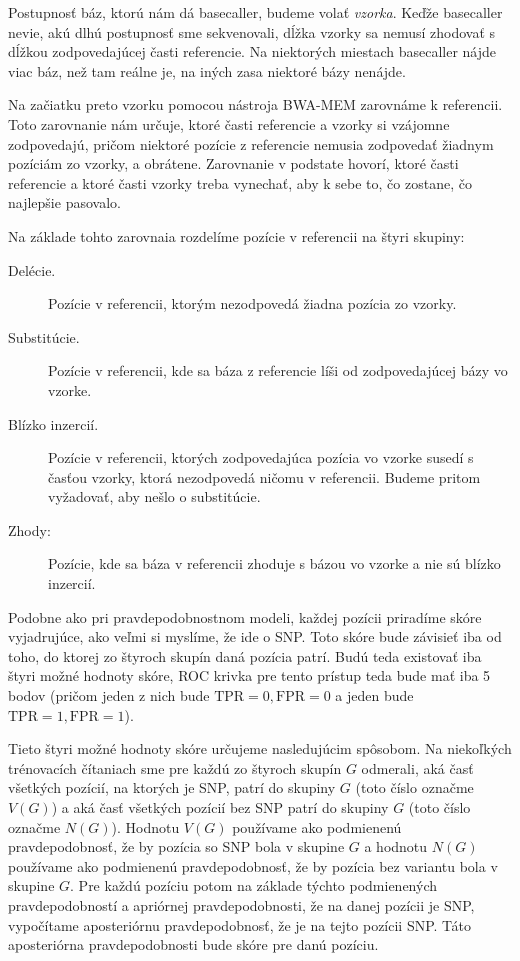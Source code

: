Postupnosť báz, ktorú nám dá basecaller, budeme volať \emph{vzorka}. Keďže basecaller nevie,
akú dlhú postupnosť sme sekvenovali, dĺžka vzorky sa nemusí zhodovať s dĺžkou 
zodpovedajúcej časti referencie.
Na niektorých miestach basecaller nájde viac báz, než tam reálne je, na iných zasa niektoré
bázy nenájde.

Na začiatku preto vzorku pomocou nástroja BWA-MEM zarovnáme k referencii. 
Toto zarovnanie nám určuje, ktoré časti referencie a vzorky si vzájomne zodpovedajú, pričom
niektoré pozície z referencie nemusia zodpovedať žiadnym pozíciám zo vzorky, a obrátene. Zarovnanie v podstate hovorí, ktoré časti referencie 
a ktoré časti vzorky treba vynechať, aby k sebe to, čo zostane, čo najlepšie pasovalo. 


Na základe
tohto zarovnaia rozdelíme pozície v referencii na štyri skupiny:

\begin{description}

\item[Delécie.] Pozície v referencii, ktorým nezodpovedá žiadna pozícia zo vzorky.
\item[Substitúcie.] Pozície v referencii, kde sa báza z referencie líši od zodpovedajúcej
bázy vo vzorke.
\item[Blízko inzercií.] Pozície v referencii, ktorých zodpovedajúca pozícia vo vzorke susedí
s časťou vzorky, ktorá nezodpovedá ničomu v referencii. Budeme pritom vyžadovať, aby nešlo
o substitúcie.
\item[Zhody:] Pozície, kde sa báza v referencii zhoduje s bázou vo vzorke a nie sú blízko inzercií.

\end{description}

Podobne ako pri pravdepodobnostnom modeli, každej pozícii priradíme skóre vyjadrujúce,
ako veľmi si myslíme, že ide o SNP. Toto skóre bude závisieť iba od toho, do ktorej zo štyroch skupín
daná pozícia patrí. Budú teda existovať iba štyri možné hodnoty skóre, ROC krivka pre tento prístup
teda bude mať iba 5 bodov (pričom jeden z nich bude $\mathrm{TPR} = 0, \mathrm{FPR} = 0$ a
jeden bude $\mathrm{TPR} = 1, \mathrm{FPR} = 1$).

Tieto štyri možné hodnoty skóre určujeme nasledujúcim spôsobom. Na niekoľkých trénovacích čítaniach
sme pre každú zo štyroch skupín $G$ odmerali, aká časť všetkých pozícií, na ktorých je SNP, patrí do skupiny $G$ 
(toto číslo označme $V(G)$)
 a aká časť všetkých pozícií bez SNP patrí do skupiny $G$ (toto číslo označme $N(G)$). 
Hodnotu $V(G)$ používame ako podmienenú pravdepodobnosť, že by pozícia so SNP bola v skupine $G$
a hodnotu $N(G)$ používame ako podmienenú pravdepodobnosť, že by pozícia bez variantu bola v skupine 
$G$. Pre každú pozíciu potom na základe týchto podmienených pravdepodobností a apriórnej 
pravdepodobnosti, že na danej pozícii je SNP, vypočítame aposteriórnu pravdepodobnosť, že je na tejto
pozícii SNP. Táto aposteriórna pravdepodobnosti bude skóre pre danú pozíciu.

